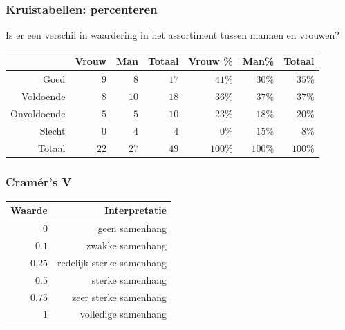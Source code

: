 \begin{frame}
	\frametitle{Kruistabellen: percenteren}
	Is er een verschil in waardering in het assortiment tussen mannen en vrouwen?
	\begin{adjustwidth}{-1.5em}{-1.5em}
		\begin{table}[h] \centering
			\begin{tabular}{@{}rrrrrrr@{}} \toprule
				& Vrouw & Man & Totaal & Vrouw \% & Man\%   & Totaal  \\ \midrule
				Goed        & $9$     & $8$  & $17$     & $41$\%  & $30$\%  & $35$\% \\
				Voldoende   & $8$     & $10$ & $18$     & $36$\%  & $37$\%  & $37$\% \\
				Onvoldoende & $5$     & $5$  & $10$     & $23$\%  & $18$\%  & $20$\% \\
				Slecht      & $0$     & $4$  & $4$      & $0$\%   & $15$\%  & $8$\%  \\
				Totaal      & $22$    & $27$ & $49$     & $100$\% & $100$\% & $100$\%\\
				\bottomrule
			\end{tabular}
		\end{table}
	\end{adjustwidth}
\end{frame}


\begin{frame}
	\frametitle{Cramér's V}
	\begin{table}[h] \centering
		\begin{tabular}{@{}rr@{}} \toprule
			Waarde & Interpretatie \\
			\midrule
			$0$ & geen samenhang \\
			$0.1$ &  zwakke samenhang \\
			$0.25$ & redelijk sterke samenhang \\
			$0.5$ & sterke samenhang \\
			$0.75$ & zeer sterke samenhang \\
			$1$ & volledige samenhang \\
			\bottomrule
		\end{tabular}
	\end{table}
\end{frame}

